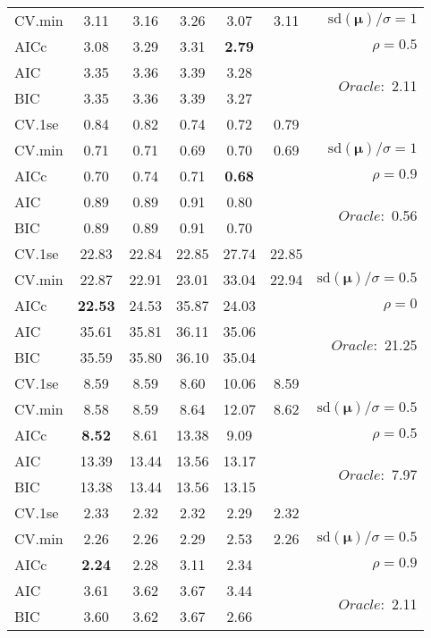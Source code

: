 \begin{table}
\begin{center}
\begin{tabular}{l*{5}{c}|r}
CV.min & 3.11 & 3.16 & 3.26 & 3.07 & 3.11 &  $\mathrm{sd}(\mathbf{\mu})/\sigma=1$ \\
AICc & 3.08 & 3.29 & 3.31 & {\bf 2.79} & & $\rho=0.5$ \\
AIC & 3.35 & 3.36 & 3.39 & 3.28 & &  \multirow{2}{*}{$Oracle: $ 2.11} \\
BIC & 3.35 & 3.36 & 3.39 & 3.27 & &  \\
 \hline 
CV.1se & 0.84 & 0.82 & 0.74 & 0.72 & 0.79 & \\
CV.min & 0.71 & 0.71 & 0.69 & 0.70 & 0.69 &  $\mathrm{sd}(\mathbf{\mu})/\sigma=1$ \\
AICc & 0.70 & 0.74 & 0.71 & {\bf 0.68} & & $\rho=0.9$ \\
AIC & 0.89 & 0.89 & 0.91 & 0.80 & &  \multirow{2}{*}{$Oracle: $ 0.56} \\
BIC & 0.89 & 0.89 & 0.91 & 0.70 & &  \\
 \hline 
CV.1se & 22.83 & 22.84 & 22.85 & 27.74 & 22.85 & \\
CV.min & 22.87 & 22.91 & 23.01 & 33.04 & 22.94 &  $\mathrm{sd}(\mathbf{\mu})/\sigma=0.5$ \\
AICc & {\bf 22.53} & 24.53 & 35.87 & 24.03 & & $\rho=0$ \\
AIC & 35.61 & 35.81 & 36.11 & 35.06 & &  \multirow{2}{*}{$Oracle: $ 21.25} \\
BIC & 35.59 & 35.80 & 36.10 & 35.04 & &  \\
 \hline 
CV.1se & 8.59 & 8.59 & 8.60 & 10.06 & 8.59 & \\
CV.min & 8.58 & 8.59 & 8.64 & 12.07 & 8.62 &  $\mathrm{sd}(\mathbf{\mu})/\sigma=0.5$ \\
AICc & {\bf 8.52} & 8.61 & 13.38 & 9.09 & & $\rho=0.5$ \\
AIC & 13.39 & 13.44 & 13.56 & 13.17 & &  \multirow{2}{*}{$Oracle: $ 7.97} \\
BIC & 13.38 & 13.44 & 13.56 & 13.15 & &  \\
 \hline 
CV.1se & 2.33 & 2.32 & 2.32 & 2.29 & 2.32 & \\
CV.min & 2.26 & 2.26 & 2.29 & 2.53 & 2.26 &  $\mathrm{sd}(\mathbf{\mu})/\sigma=0.5$ \\
AICc & {\bf 2.24} & 2.28 & 3.11 & 2.34 & & $\rho=0.9$ \\
AIC & 3.61 & 3.62 & 3.67 & 3.44 & &  \multirow{2}{*}{$Oracle: $ 2.11} \\
BIC & 3.60 & 3.62 & 3.67 & 2.66 & &  \\
 \hline 
\end{tabular}
\end{center}
\vspace{-1cm}
\end{table}




